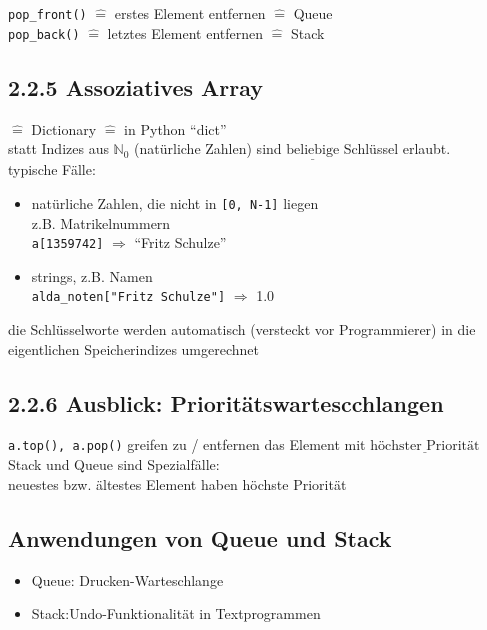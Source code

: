 \documentclass[11pt, fleqn]{scrreprt}
\begin{document}
		\verb|pop_front()| $\widehat{=}$ erstes Element entfernen $\widehat{=}$ Queue \\
		\verb|pop_back()| $\widehat{=}$ letztes Element entfernen $\widehat{=}$ Stack \\
		
		\subsection*{2.2.5 Assoziatives Array}
		$\widehat{=}$ Dictionary $\widehat{=}$ in Python ``dict'' \\
		
		statt Indizes aus $\mathbb{N}_{0}$ (natürliche Zahlen) sind $\underline{\text{beliebige}}$ Schlüssel erlaubt. \\
		
		typische Fälle:
		\begin{itemize}[label={-}]
			\item natürliche Zahlen, die nicht in \verb|[0, N-1]| liegen \\
			z.B. Matrikelnummern \\
			\verb|a[1359742]| $\Rightarrow$ ``Fritz Schulze'' 
			\item strings, z.B. Namen \\
			\verb|alda_noten["Fritz Schulze"]| $\Rightarrow$ 1.0 
		\end{itemize}
		die Schlüsselworte werden automatisch (versteckt vor Programmierer) in die eigentlichen Speicherindizes umgerechnet \\
		
		\subsection*{2.2.6 Ausblick: Prioritätswartescchlangen}
		\verb|a.top(), a.pop()| greifen zu / entfernen das Element mit $\underline{\text{höchster Priorität}}$\\
		
		Stack und Queue sind Spezialfälle: \\
		neuestes bzw. ältestes Element haben höchste Priorität \\
		
		
		\subsection*{Anwendungen von Queue und Stack}
		\begin{itemize}
			\item Queue: Drucken-Warteschlange
			\item Stack:Undo-Funktionalität in Textprogrammen
		\end{itemize}
		
\end{document}
